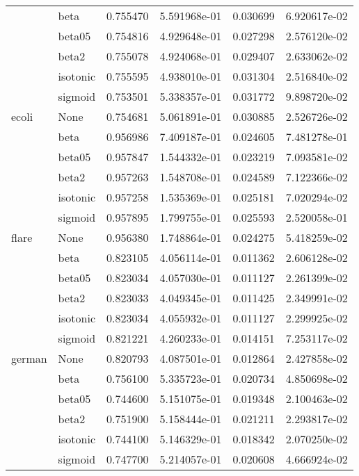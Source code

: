 \begin{tabular}{llrrrr}
        & beta &  0.755470 &  5.591968e-01 &  0.030699 &  6.920617e-02 \\
        & beta05 &  0.754816 &  4.929648e-01 &  0.027298 &  2.576120e-02 \\
        & beta2 &  0.755078 &  4.924068e-01 &  0.029407 &  2.633062e-02 \\
        & isotonic &  0.755595 &  4.938010e-01 &  0.031304 &  2.516840e-02 \\
        & sigmoid &  0.753501 &  5.338357e-01 &  0.031772 &  9.898720e-02 \\
ecoli & None &  0.754681 &  5.061891e-01 &  0.030885 &  2.526726e-02 \\
        & beta &  0.956986 &  7.409187e-01 &  0.024605 &  7.481278e-01 \\
        & beta05 &  0.957847 &  1.544332e-01 &  0.023219 &  7.093581e-02 \\
        & beta2 &  0.957263 &  1.548708e-01 &  0.024589 &  7.122366e-02 \\
        & isotonic &  0.957258 &  1.535369e-01 &  0.025181 &  7.020294e-02 \\
        & sigmoid &  0.957895 &  1.799755e-01 &  0.025593 &  2.520058e-01 \\
flare & None &  0.956380 &  1.748864e-01 &  0.024275 &  5.418259e-02 \\
        & beta &  0.823105 &  4.056114e-01 &  0.011362 &  2.606128e-02 \\
        & beta05 &  0.823034 &  4.057030e-01 &  0.011127 &  2.261399e-02 \\
        & beta2 &  0.823033 &  4.049345e-01 &  0.011425 &  2.349991e-02 \\
        & isotonic &  0.823034 &  4.055932e-01 &  0.011127 &  2.299925e-02 \\
        & sigmoid &  0.821221 &  4.260233e-01 &  0.014151 &  7.253117e-02 \\
german & None &  0.820793 &  4.087501e-01 &  0.012864 &  2.427858e-02 \\
        & beta &  0.756100 &  5.335723e-01 &  0.020734 &  4.850698e-02 \\
        & beta05 &  0.744600 &  5.151075e-01 &  0.019348 &  2.100463e-02 \\
        & beta2 &  0.751900 &  5.158444e-01 &  0.021211 &  2.293817e-02 \\
        & isotonic &  0.744100 &  5.146329e-01 &  0.018342 &  2.070250e-02 \\
        & sigmoid &  0.747700 &  5.214057e-01 &  0.020608 &  4.666924e-02 \\

\end{tabular}

